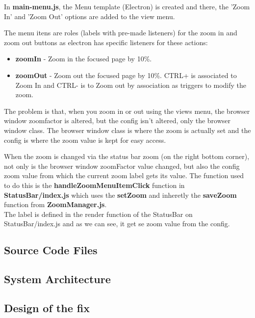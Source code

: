 \documentclass[main.tex]{subfiles}
\begin{document}
In \textbf{main-menu.js}, the Menu template (Electron) is created and there, the 'Zoom In' and 'Zoom Out' options are added to the view menu.

The menu itens are roles (labels with pre-made listeners) for the zoom in and zoom out buttons as electron has specific listeners for these actions:

\begin{itemize}
\item \textbf{zoomIn} - Zoom in the focused page by 10\%.
\item \textbf{zoomOut} - Zoom out the focused page by 10\%. CTRL+ is associated to Zoom In and CTRL- is to Zoom out by association as triggers to modify the zoom.
\end{itemize}


The problem is that, when you zoom in or out using the views menu, the browser window zoomfactor is altered, but the config isn't altered, only the browser window class. The browser window class is where the zoom is actually set and the config is where the zoom value is kept for easy access.

When the zoom is changed via the status bar zoom (on the right bottom corner), not only is the browser window zoomFactor value changed, but also the config zoom value from which the current zoom label gets its value. The function used to do this is the \textbf{handleZoomMenuItemClick} function in \textbf{StatusBar/index.js} which uses the \textbf{setZoom} and inheretly the \textbf{saveZoom} function from\textbf{ ZoomManager.js}.\\

The label is defined in the render function of the StatusBar on StatusBar/index.js and as we can see, it get se zoom value from the config.
\clearpage

\subsection{Source Code Files}

\subsection{System Architecture}

\subsection{Design of the fix}

\nocite{*}
\end{document}
